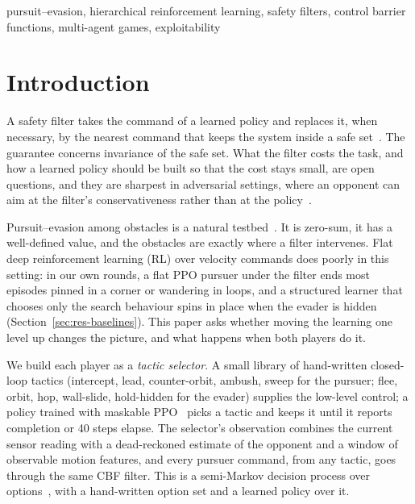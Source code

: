 \documentclass[conference]{IEEEtran}
\begin{document}
\begin{IEEEkeywords}
pursuit--evasion, hierarchical reinforcement learning, safety filters, control barrier functions, multi-agent games, exploitability
\end{IEEEkeywords}

\section{Introduction}
A safety filter takes the command of a learned policy and replaces it, when necessary, by the nearest command that keeps the system inside a safe set~\cite{hsu2024safetyfilter,ames2019cbf,alshiekh2018shielding,cheng2019endtoend}. The guarantee concerns invariance of the safe set. What the filter costs the task, and how a learned policy should be built so that the cost stays small, are open questions, and they are sharpest in adversarial settings, where an opponent can aim at the filter's conservativeness rather than at the policy~\cite{wu2026competence,arnstrom2025stealthy}.

Pursuit--evasion among obstacles is a natural testbed~\cite{isaacs1965differential,chung2011search}. It is zero-sum, it has a well-defined value, and the obstacles are exactly where a filter intervenes. Flat deep reinforcement learning (RL) over velocity commands does poorly in this setting: in our own rounds, a flat PPO pursuer under the filter ends most episodes pinned in a corner or wandering in loops, and a structured learner that chooses only the search behaviour spins in place when the evader is hidden (Section~\ref{sec:res-baselines}). This paper asks whether moving the learning one level up changes the picture, and what happens when both players do it.

We build each player as a \emph{tactic selector}. A small library of hand-written closed-loop tactics (intercept, lead, counter-orbit, ambush, sweep for the pursuer; flee, orbit, hop, wall-slide, hold-hidden for the evader) supplies the low-level control; a policy trained with maskable PPO~\cite{schulman2017ppo,huang2022masking} picks a tactic and keeps it until it reports completion or 40 steps elapse. The selector's observation combines the current sensor reading with a dead-reckoned estimate of the opponent and a window of observable motion features, and every pursuer command, from any tactic, goes through the same CBF filter. This is a semi-Markov decision process over options~\cite{sutton1999between}, with a hand-written option set and a learned policy over it.
\end{document}
